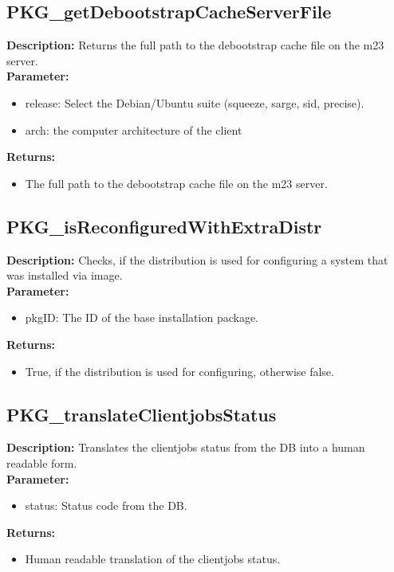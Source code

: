 \subsection{PKG\_getDebootstrapCacheServerFile}
\textbf{Description:} Returns the full path to the debootstrap cache file on the m23 server.\\
\textbf{Parameter:}
\begin{itemize}
\item release: Select the Debian/Ubuntu suite (squeeze, sarge, sid, precise).
\item arch: the computer architecture of the client
\end{itemize}
\textbf{Returns:}
\begin{itemize}
\item The full path to the debootstrap cache file on the m23 server.
\end{itemize}

\subsection{PKG\_isReconfiguredWithExtraDistr}
\textbf{Description:} Checks, if the distribution is used for configuring a system that was installed via image.\\
\textbf{Parameter:}
\begin{itemize}
\item pkgID: The ID of the base installation package.
\end{itemize}
\textbf{Returns:}
\begin{itemize}
\item True, if the distribution is used for configuring, otherwise false.
\end{itemize}

\subsection{PKG\_translateClientjobsStatus}
\textbf{Description:} Translates the clientjobs status from the DB into a human readable form.\\
\textbf{Parameter:}
\begin{itemize}
\item status: Status code from the DB.
\end{itemize}
\textbf{Returns:}
\begin{itemize}
\item Human readable translation of the clientjobs status.
\end{itemize}

